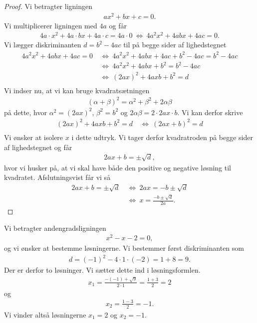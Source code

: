 \documentclass[12pt]{article}
\begin{document}
\begin{proof}
	Vi betragter ligningen
	\begin{align*}
		ax^2 + bx + c = 0.
	\end{align*}
	Vi multiplicerer ligningen med $4a$ og får
	\begin{align*}
		4a\cdot x^2 + 4a\cdot bx + 4a \cdot c = 4a\cdot 0 \ \Leftrightarrow \ 4a^2x^2 + 4abx + 4ac = 0.
	\end{align*}
	Vi lægger diskriminanten $d = b^2 - 4ac$ til på begge sider af lighedstegnet
	\begin{align*}
		4a^2x^2 + 4abx + 4ac = 0 \ &\Leftrightarrow \ 4a^2x^2 + 4abx + 4ac + b^2 - 4ac = b^2 - 4ac \\
		&\Leftrightarrow \ 4a^2x^2 + 4abx + b^2 = b^2 - 4ac \\
		&\Leftrightarrow \ (2ax)^2 + 4axb + b^2 = d\\
	\end{align*}
	Vi indser nu, at vi kan bruge kvadratsætningen
	\begin{align*}
		(\alpha + \beta)^2 = \alpha^2 + \beta^2 + 2\alpha\beta
	\end{align*}
	på dette, hvor $\alpha^2 = (2ax)^2$, $\beta^2 = b^2$ og $2\alpha\beta = 2\cdot 2ax \cdot b$. 
	Vi kan derfor skrive
	\begin{align*}
		(2ax)^2 + 4axb + b^2 = d \ &\Leftrightarrow \ (2ax + b)^2 = d \\
	\end{align*}
	Vi ønsker at isolere $x$ i dette udtryk. Vi tager derfor kvadratroden på begge sider af lighedstegnet og
	får
	\begin{align*}
		2ax + b = \pm \sqrt{d},
	\end{align*}
	hvor vi husker på, at vi skal have både den positive og negative løsning til kvadratet.
	Afslutningsvist får vi så
	\begin{align*}
		2ax + b = \pm \sqrt{d} \ &\Leftrightarrow	\ 2ax =-b \pm \sqrt{d}\\
		&\Leftrightarrow \ x = \frac{-b \pm \sqrt{d}}{2a}.
	\end{align*}
\end{proof}
\begin{exa}
	Vi betragter andengradsligningen 
	\begin{align*}
		x^2 - x - 2 = 0,
	\end{align*}
	og vi ønsker at bestemme løsningerne. Vi bestemmer først diskriminanten som
	\begin{align*}
		d = (-1)^2 - 4\cdot 1 \cdot (-2) = 1 + 8  = 9.
	\end{align*}
	Der er derfor to løsninger. Vi sætter dette ind i løsningsformlen. 
	\begin{align*}
		x_1 = \frac{-(-1)+\sqrt{9}}{2\cdot 1} = \frac{1+3}{2} = 2
	\end{align*}
	og 
	\begin{align*}
		x_2 = \frac{1-3}{2} = -1.
	\end{align*}
	Vi vinder altså løsningerne $x_1 = 2$ og $x_2 = -1$. 
\end{exa}
\end{document}
